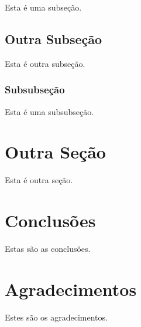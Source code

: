 \documentclass[conference,harvard,brazil,english]{sbatex}
\begin{document}
	Esta é uma subseção.

\subsection{Outra Subseção}

	Esta é outra subseção.

\subsubsection{Subsubseção}

	Esta é uma subsubseção.

\section{Outra Seção}
	
	Esta é outra seção.

\section{Conclusões}

	Estas são as conclusões.

\section*{Agradecimentos}

	Estes são os agradecimentos.


\end{document}
